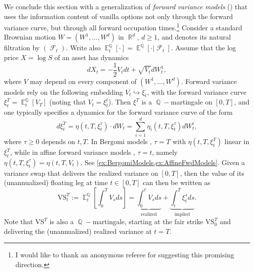 \documentclass[11pt]{article}
\theoremstyle{plain}
\theoremstyle{definition}
\DeclareMathOperator{\E}{\mathbb{E}}
\DeclareMathOperator{\Q}{\mathbb{Q}}
\DeclareMathOperator{\R}{\mathbb{R}}
\DeclareMathOperator{\calF}{\mathcal{F}}
\begin{document}
We conclude this section with a generalization of  
\textit{forward variance models} (\cite{Bergomi,GatheralKeller}) that uses the information content of vanilla options not only through the forward variance curve, but through all forward occupation times.\footnote{I would like to thank an anonymous referee for suggesting this promising direction. } %
Consider a standard Brownian motion $W = (W^1,\ldots, W^d)$ in $\R^d$, $d\ge 1$, and denotes its natural filtration by $(\calF_t)$. Write also $\E^{\Q}_t[\cdot ]= \E^{\Q}[ \cdot  |\calF_t]$. Assume that the log price  $X = \log S$ of an asset has dynamics 
$$dX_t = - \frac{1}{2}V_tdt + \sqrt{V_t}dW_t^1,$$
where  $V$ may depend on every component of $(W^1,\ldots, W^d)$.  Forward variance models \cite{Bergomi,GatheralKeller} rely on the following embedding $V_t \hookrightarrow \xi_t^{\cdot}$, with the  forward variance curve $\xi_t^T =  \E^{\Q}_t[V_T]$ (noting that $V_t= \xi_t^t$). %
Then $\xi^T$ is a $\Q-$martingale on $[0,T]$, and one typically specifies a dynamics for the forward variance curve of the form 
\begin{equation}\label{eq:fwdVarDynamics}
    d\xi_t^T = \eta(t,T,\xi_t^{\tau})\cdot dW_t = \sum_{i=1}^d \eta_i(t,T,\xi_t^{\tau}) dW_t^i,
\end{equation}
where $\tau \ge 0$ depends on $t,T$. In Bergomi models \cite{Bergomi}, $\tau = T$ with $\eta(t,T,\xi_t^{T})$ linear in $\xi_t^{T}$, while in  affine forward variance models \cite{GatheralKeller},  $\tau= t$, namely $\eta(t,T,\xi_t^{\tau}) = \eta(t,T,V_t)$. See \cref{ex:BergomiModels,ex:AffineFwdModels}. 
Given a variance swap that delivers the realized variance on $[0,T]$, then 
the value of its  (unannualized) floating leg  at time $t\in [0,T]$ can then be written  as 
\begin{equation}\label{eq:VSt}
    \text{VS}_t^T := \E^{\Q}_t[\int_0^T V_sds] = \underbrace{\int_0^t V_sds}_{\text{realized}} + \underbrace{\int_t^T \xi_t^sds}_{\text{implied}}. 
\end{equation}
Note that $\text{VS}^T$ is also a $\Q-$martingale, starting at the fair strike $\text{VS}^T_0$  and delivering the (unannualized) realized variance at $t = T$. %
\end{document}

